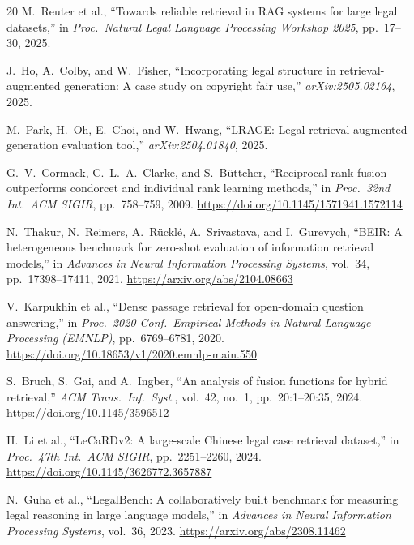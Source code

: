 \documentclass[conference]{IEEEtran}
\begin{document}
\begin{thebibliography}{20}
M.~Reuter et al.,
``Towards reliable retrieval in RAG systems for large legal datasets,''
in \emph{Proc.\ Natural Legal Language Processing Workshop 2025},
pp.~17--30, 2025.

J.~Ho, A.~Colby, and W.~Fisher,
``Incorporating legal structure in retrieval-augmented generation:
A case study on copyright fair use,''
\emph{arXiv:2505.02164}, 2025.

M.~Park, H.~Oh, E.~Choi, and W.~Hwang,
``LRAGE: Legal retrieval augmented generation evaluation tool,''
\emph{arXiv:2504.01840}, 2025.

G.~V.~Cormack, C.~L.~A.~Clarke, and S.~B\"uttcher,
``Reciprocal rank fusion outperforms condorcet and individual rank
learning methods,''
in \emph{Proc.\ 32nd Int.\ ACM SIGIR}, pp.~758--759, 2009.
\url{https://doi.org/10.1145/1571941.1572114}

N.~Thakur, N.~Reimers, A.~R\"uckl\'e, A.~Srivastava, and I.~Gurevych,
``BEIR: A heterogeneous benchmark for zero-shot evaluation of
information retrieval models,''
in \emph{Advances in Neural Information Processing Systems}, vol.~34,
pp.~17398--17411, 2021.
\url{https://arxiv.org/abs/2104.08663}

V.~Karpukhin et al.,
``Dense passage retrieval for open-domain question answering,''
in \emph{Proc.\ 2020 Conf.\ Empirical Methods in Natural Language
Processing (EMNLP)}, pp.~6769--6781, 2020.
\url{https://doi.org/10.18653/v1/2020.emnlp-main.550}

S.~Bruch, S.~Gai, and A.~Ingber,
``An analysis of fusion functions for hybrid retrieval,''
\emph{ACM Trans.\ Inf.\ Syst.}, vol.~42, no.~1, pp.~20:1--20:35, 2024.
\url{https://doi.org/10.1145/3596512}

H.~Li et al.,
``LeCaRDv2: A large-scale Chinese legal case retrieval dataset,''
in \emph{Proc.\ 47th Int.\ ACM SIGIR}, pp.~2251--2260, 2024.
\url{https://doi.org/10.1145/3626772.3657887}

N.~Guha et al.,
``LegalBench: A collaboratively built benchmark for measuring legal
reasoning in large language models,''
in \emph{Advances in Neural Information Processing Systems}, vol.~36,
2023.
\url{https://arxiv.org/abs/2308.11462}

\end{thebibliography}
\end{document}

